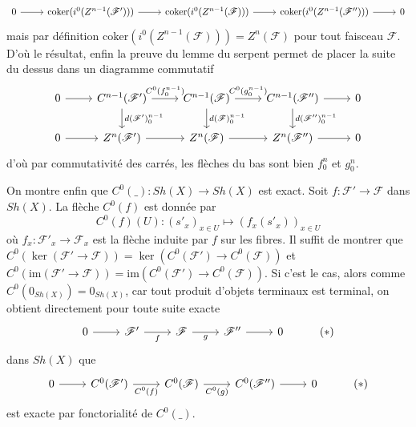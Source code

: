 \documentclass[a4paper,12pt]{article}
\newcommand{\F}{\mathscr F}
\newcommand{\im}{\textrm{im}}
\newcommand{\coker}{\textrm{coker}}
\theoremstyle{plain}
\theoremstyle{definition}
\theoremstyle{remark}
\begin{document}
\[\begin{tikzcd}
	0 & {\coker(i^0(Z^{n-1}(\F')))} & {\coker(i^0(Z^{n-1}(\F)))} & {\coker(i^0(Z^{n-1}(\F'')))} & 0
	\arrow[from=1-1, to=1-2]
	\arrow[from=1-2, to=1-3]
	\arrow[from=1-3, to=1-4]
	\arrow[from=1-4, to=1-5]
\end{tikzcd}\]
mais par définition $\coker(i^0(Z^{n-1}(\F)))=Z^n(\F)$ pour tout 
faisceau $\F$. D'où le résultat, enfin la preuve du lemme du serpent
permet de placer la suite du dessus dans un diagramme commutatif
\[\begin{tikzcd}
	0 & {C^{n-1}(\F')} & {C^{n-1}(\F)} & {C^{n-1}(\F'')} & 0 \\
	0 & {Z^{n}(\F')} & {Z^{n}(\F)} & {Z^{n}(\F'')} & 0
	\arrow[from=1-1, to=1-2]
	\arrow["{C^0(f_0^{n-1})}", from=1-2, to=1-3]
	\arrow["d(\F')_0^{n-1}",from=1-2, to=2-2]
	\arrow["{C^0(g_0^{n-1})}", from=1-3, to=1-4]
	\arrow["d(\F)_0^{n-1}",from=1-3, to=2-3]
	\arrow[from=1-4, to=1-5]
	\arrow["d(\F'')_0^{n-1}",from=1-4, to=2-4]
	\arrow[from=2-1, to=2-2]
	\arrow[from=2-2, to=2-3]
	\arrow[from=2-3, to=2-4]
	\arrow[from=2-4, to=2-5]
\end{tikzcd}\]
d'où par commutativité des carrés, les flèches du bas sont bien 
$f_0^n$ et $g_0^n$.

On montre enfin que $C^0(\_)\colon Sh(X)\to Sh(X)$ est
exact. Soit $f\colon \F'\to\F$ dans $Sh(X)$. La flèche $C^0(f)$ est 
donnée par
\[C^0(f)(U)\colon (s'_x)_{x\in U}\mapsto (f_x(s'_x))_{x\in U}\] 
où $f_x\colon \F'_x\to \F_x$ est la flèche induite par $f$ sur les
fibres. Il suffit de montrer que 
$C^0(\ker(\F'\to \F))=\ker(C^0(\F')\to C^0(\F))$
et $C^0(\im(\F'\to \F))=\im(C^0(\F')\to C^0(\F))$. Si c'est le cas,
alors comme $C^0(0_{Sh(X)})=0_{Sh(X)}$, car tout produit d'objets
terminaux est terminal, on obtient directement pour toute suite exacte
\[\begin{tikzcd}
	0 & {\F'} & \F & {\F''} & 0 & {(*)}
	\arrow[from=1-1, to=1-2]
	\arrow["f"', from=1-2, to=1-3]
	\arrow["g"', from=1-3, to=1-4]
	\arrow[from=1-4, to=1-5]
\end{tikzcd}\]
dans $Sh(X)$ que
\[\begin{tikzcd}
	0 & {C^0(\F')} & {C^0(\F)} & {C^0(\F'')} & 0 & {(*)}
	\arrow[from=1-1, to=1-2]
	\arrow["C^0(f)"', from=1-2, to=1-3]
	\arrow["C^0(g)"', from=1-3, to=1-4]
	\arrow[from=1-4, to=1-5]
\end{tikzcd}\]
est exacte par fonctorialité de $C^0(\_)$. 
\end{document}
